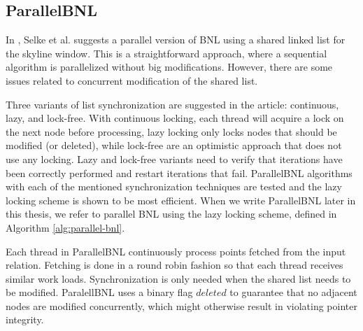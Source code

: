 \documentclass[12pt,a4paper,twoside]{report}
\begin{document}
\subsection{ParallelBNL}
\label{sec:parallel-bnl}

In \cite{selke2010highly}, Selke et al. suggests a parallel
version of BNL using a shared linked list for the skyline window.
This is a straightforward approach, where a sequential algorithm
is parallelized without big modifications. However, there are some
issues related to concurrent modification of the shared list.

Three variants of list synchronization are suggested in the
article: continuous, lazy, and lock-free. With continuous locking,
each thread will acquire a lock on the next node before
processing, lazy locking \cite{heller2006lazy} only locks nodes
that should be modified (or deleted), while lock-free are an
optimistic approach that does not use any locking. Lazy and
lock-free variants need to verify that iterations have been
correctly performed and restart iterations that fail. ParallelBNL
algorithms with each of the mentioned synchronization techniques
are tested and the lazy locking scheme is shown to be most
efficient. When we write ParallelBNL later in this thesis, we
refer to parallel BNL using the lazy locking scheme, defined in
Algorithm \ref{alg:parallel-bnl}.

Each thread in ParallelBNL continuously process points fetched
from the input relation. Fetching is done in a round robin fashion
so that each thread receives similar work loads. Synchronization
is only needed when the shared list needs to be modified.
ParalellBNL uses a binary flag $deleted$ to guarantee that no
adjacent nodes are modified concurrently, which might otherwise
result in violating pointer integrity.
\end{document}
